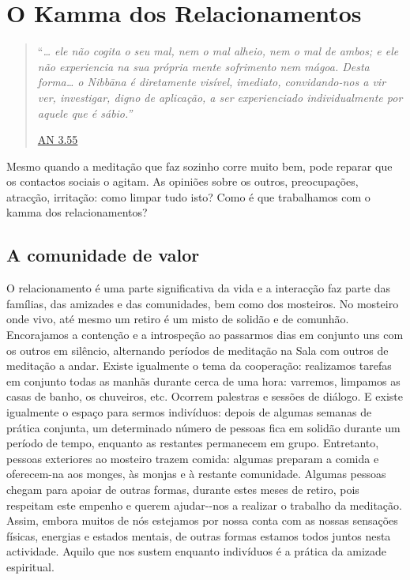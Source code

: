 \chapter{O Kamma dos Relacionamentos}

\begin{quote}

``\emph{\ldots{} ele não cogita o seu mal, nem o mal alheio, nem o mal de ambos; e ele não experiencia na sua própria mente sofrimento nem mágoa. Desta forma\ldots{} o Nibbāna é diretamente visível, imediato, convidando-nos a vir ver, investigar, digno de aplicação, a ser experienciado individualmente por aquele que é sábio.''}

\href{https://suttacentral.net/an3.55/en/bodhi}{AN 3.55}
\end{quote}

Mesmo quando a meditação que faz sozinho corre muito bem, pode reparar que os contactos sociais o agitam. As opiniões sobre os outros, preocupações, atracção, irritação: como limpar tudo isto? Como é que trabalhamos com o kamma dos relacionamentos?

\section{A comunidade de valor}

O relacionamento é uma parte significativa da vida e a interacção faz parte das famílias, das amizades e das comunidades, bem como dos mosteiros. No mosteiro onde vivo, até mesmo um retiro é um misto de solidão e de comunhão. Encorajamos a contenção e a introspeção ao passarmos dias em conjunto uns com os outros em silêncio, alternando períodos de meditação na Sala com outros de meditação a andar. Existe igualmente o tema da cooperação: realizamos tarefas em conjunto todas as manhãs durante cerca de uma hora: varremos, limpamos as casas de banho, os chuveiros, etc. Ocorrem palestras e sessões de diálogo. E existe igualmente o espaço para sermos indivíduos: depois de algumas semanas de prática conjunta, um determinado número de pessoas fica em solidão durante um período de tempo, enquanto as restantes permanecem em grupo. Entretanto, pessoas exteriores ao mosteiro trazem comida: algumas preparam a comida e oferecem-na aos monges, às monjas e à restante comunidade. Algumas pessoas chegam para apoiar de outras formas, durante estes meses de retiro, pois respeitam este empenho e querem ajudar-\/-nos a realizar o trabalho da meditação. Assim, embora muitos de nós estejamos por nossa conta com as nossas sensações físicas, energias e estados mentais, de outras formas estamos todos juntos nesta actividade. Aquilo que nos sustem enquanto indivíduos é a prática da amizade espiritual.

